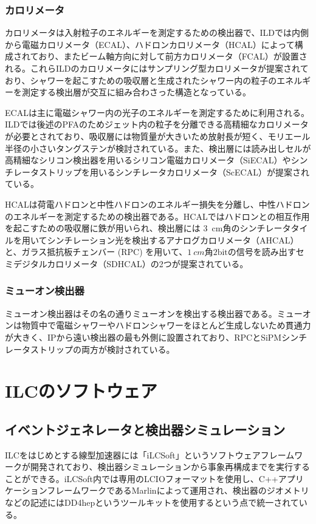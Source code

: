 \subsubsection{カロリメータ}
カロリメータは入射粒子のエネルギーを測定するための検出器で、ILDでは内側から電磁カロリメータ（ECAL）、ハドロンカロリメータ（HCAL）によって構成されており、またビーム軸方向に対して前方カロリメータ（FCAL）が設置される。これらILDのカロリメータにはサンプリング型カロリメータが提案されており、シャワーを起こすための吸収層と生成されたシャワー内の粒子のエネルギーを測定する検出層が交互に組み合わさった構造となっている。

ECALは主に電磁シャワー内の光子のエネルギーを測定するために利用される。ILDでは後述のPFAのためジェット内の粒子を分離できる高精細なカロリメータが必要とされており、吸収層には物質量が大きいため放射長が短く、モリエール半径の小さいタングステンが検討されている。また、検出層には読み出しセルが高精細なシリコン検出器を用いるシリコン電磁カロリメータ（SiECAL）やシンチレータストリップを用いるシンチレータカロリメータ（ScECAL）が提案されている。

HCALは荷電ハドロンと中性ハドロンのエネルギー損失を分離し、中性ハドロンのエネルギーを測定するための検出器である。HCALではハドロンとの相互作用を起こすための吸収層に鉄が用いられ、検出層には \SI{3}{cm}角のシンチレータタイルを用いてシンチレーション光を検出するアナログカロリメータ（AHCAL）と、ガラス抵抗板チェンバー (RPC) を用いて、$\SI{1}{cm}$角$2\mathrm{bit}$の信号を読み出すセミデジタルカロリメータ（SDHCAL）の2つが提案されている。

\subsubsection{ミューオン検出器}
ミューオン検出器はその名の通りミューオンを検出する検出器である。ミューオンは物質中で電磁シャワーやハドロンシャワーをほとんど生成しないため貫通力が大きく、IPから遠い検出器の最も外側に設置されており、RPCとSiPMシンチレータストリップの両方が検討されている。

\section{ILCのソフトウェア}
\subsection{イベントジェネレータと検出器シミュレーション}
ILCをはじめとする線型加速器には「iLCSoft」というソフトウェアフレームワークが開発されており、検出器シミュレーションから事象再構成までを実行することができる。iLCSoft内では専用のLCIOフォーマットを使用し、C++アプリケーションフレームワークであるMarlinによって運用され、検出器のジオメトリなどの記述にはDD4hepというツールキットを使用するという点で統一されている。

